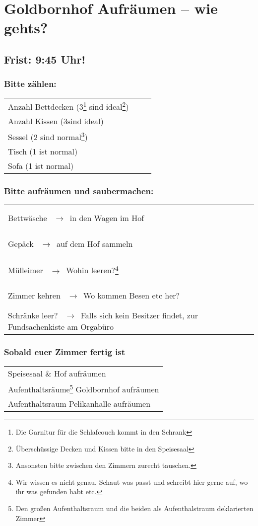 \documentclass[14pt,parskip=full+]{scrartcl}
\newcommand{\checkfield}{~ \hfill ~\raisebox{-5pt}{\tikz\node[draw,minimum width=16.8pt,minimum height=16.8pt]{};}}
\newcommand{\countfield}{~ \hfill ~\raisebox{-5pt}{\tikz\node[draw,minimum width=33.6pt,minimum height=16.8pt]{};}}
\newcommand{\pfeil}{~\ensuremath{\rightarrow}~}
\newcommand{\mysection}[1]{\vspace{-.7\baselineskip}\subsubsection*{#1} \vspace{-.7\baselineskip}}
\begin{document}
\parbox[t]{.8\textwidth}{\vskip0pt
\section*{Goldbornhof Aufr\"aumen -- wie gehts?}
}

\subsection*{Frist: 9:45 Uhr!}

\bigskip

\def\arraystretch{1.3}

\mysection{Bitte z\"ahlen:}
\begin{tabularx}{\textwidth}{Xc}
Anzahl Bettdecken (3\footnote{Die Garnitur für die Schlafcouch kommt in den Schrank} sind ideal\footnote{\"Ubersch\"ussige Decken und Kissen bitte in den Speisesaal}) & \countfield \\
Anzahl Kissen (3\footnotemark[1] sind ideal\footnotemark[2]) & \countfield \\
Sessel (2 sind normal\footnote{Ansonsten bitte zwischen den Zimmern zurecht tauschen.}) & \countfield \\
Tisch (1 ist normal\footnotemark[3]) & \countfield \\
Sofa (1 ist normal\footnotemark[3]) & \countfield
\end{tabularx}

\mysection{Bitte aufr\"aumen und saubermachen:}
\begin{tabularx}{\textwidth}{Xc}
Bettw\"asche \pfeil in den Wagen im Hof & \checkfield \\
Gep\"ack \pfeil auf dem Hof sammeln & \checkfield \\
M\"ulleimer \pfeil Wohin leeren?\footnote{Wir wissen es nicht genau. Schaut was passt und schreibt hier gerne auf, wo ihr was gefunden habt etc.} & \checkfield \\
Zimmer kehren \pfeil {Wo kommen Besen etc her?}\footnotemark[4] & \checkfield \\
Schr\"anke leer? \pfeil Falls sich kein Besitzer findet, zur Fundsachenkiste am Orgabüro & \checkfield
\end{tabularx}

\mysection{Sobald euer Zimmer fertig ist}
\begin{tabularx}{\textwidth}{X}
Speisesaal \& Hof aufräumen \\
Aufenthaltsräume\footnote{Den großen Aufenthaltsraum und die beiden als Aufenthalstraum deklarierten Zimmer} Goldbornhof aufräumen \\
Aufenthaltsraum Pelikanhalle aufräumen \\
\end{tabularx}
\end{document}
